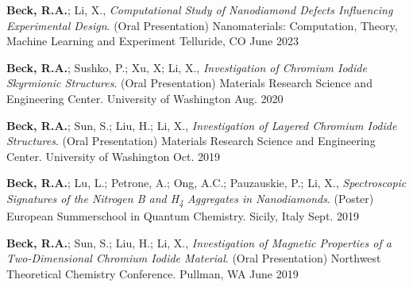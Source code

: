 

\begin{cvpresentations}

\cvpresentation %
{\textbf{Beck, R.A.}; Li, X., \textit{Computational Study of Nanodiamond Defects Influencing Experimental Design}. (Oral Presentation) Nanomaterials: Computation, Theory, Machine Learning and Experiment}
{Telluride, CO} %
{June 2023} %

\cvpresentation %
{\textbf{Beck, R.A.}; Sushko, P.; Xu, X; Li, X., \textit{Investigation of Chromium Iodide Skyrmionic Structures}. (Oral Presentation) Materials Research Science and Engineering Center.}
{University of Washington} %
{Aug. 2020} %


\cvpresentation %
{\textbf{Beck, R.A.}; Sun, S.; Liu, H.; Li, X., \textit{Investigation of Layered Chromium Iodide Structures}. (Oral Presentation) Materials Research Science and Engineering Center.}
{University of Washington} %
{Oct. 2019} %


\cvpresentation %
{\textbf{Beck, R.A.}; Lu, L.; Petrone, A.; Ong, A.C.; Pauzauskie, P.; Li, X., \textit{Spectroscopic Signatures of the Nitrogen B and H\textsubscript{4} Aggregates in Nanodiamonds}. (Poster) European Summerschool in Quantum Chemistry.}
{Sicily, Italy} %
{Sept. 2019} %


\cvpresentation %
{\textbf{Beck, R.A.}; Sun, S.; Liu, H.; Li, X., \textit{Investigation of Magnetic Properties of a Two-Dimensional Chromium Iodide Material}. (Oral Presentation) Northwest Theoretical Chemistry Conference.}
{Pullman, WA} %
{June 2019} %



\end{cvpresentations}
